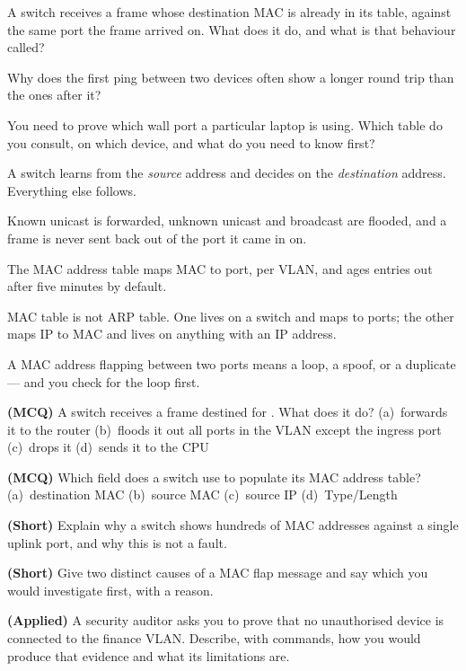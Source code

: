 \begin{checkpoint}
\begin{tightnum}
  \item A switch receives a frame whose destination MAC is already in its table,
        against the same port the frame arrived on. What does it do, and what is
        that behaviour called?
  \item Why does the first ping between two devices often show a longer round
        trip than the ones after it?
  \item You need to prove which wall port a particular laptop is using. Which
        table do you consult, on which device, and what do you need to know first?
\end{tightnum}
\end{checkpoint}

\begin{chaptersummary}
\begin{tight}
  \item A switch learns from the \emph{source} address and decides on the
        \emph{destination} address. Everything else follows.
  \item Known unicast is forwarded, unknown unicast and broadcast are flooded,
        and a frame is never sent back out of the port it came in on.
  \item The MAC address table maps MAC to port, per VLAN, and ages entries out
        after five minutes by default.
  \item MAC table is not ARP table. One lives on a switch and maps to ports; the
        other maps IP to MAC and lives on anything with an IP address.
  \item A MAC address flapping between two ports means a loop, a spoof, or a
        duplicate --- and you check for the loop first.
\end{tight}
\end{chaptersummary}

\begin{reviewq}
  \item \textbf{(MCQ)} A switch receives a frame destined for
        . What does it do?
        (a)~forwards it to the router (b)~floods it out all ports in the VLAN
        except the ingress port (c)~drops it (d)~sends it to the CPU
  \item \textbf{(MCQ)} Which field does a switch use to populate its MAC address
        table? (a)~destination MAC (b)~source MAC (c)~source IP (d)~Type/Length
  \item \textbf{(Short)} Explain why a switch shows hundreds of MAC addresses
        against a single uplink port, and why this is not a fault.
  \item \textbf{(Short)} Give two distinct causes of a MAC flap message and say
        which you would investigate first, with a reason.
  \item \textbf{(Applied)} A security auditor asks you to prove that no
        unauthorised device is connected to the finance VLAN. Describe, with
        commands, how you would produce that evidence and what its limitations
        are.
\end{reviewq}
